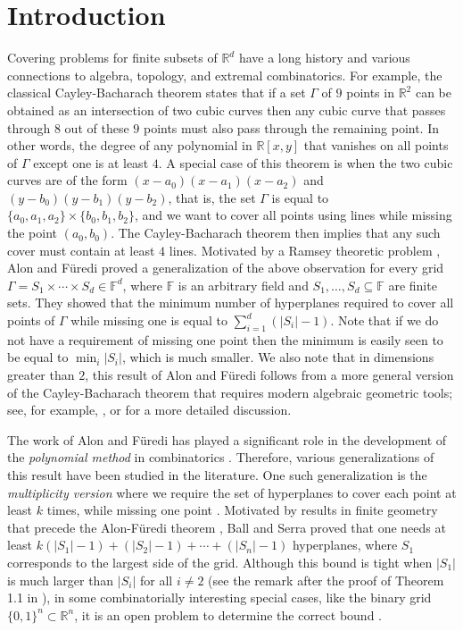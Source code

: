\documentclass[usenames,dvipsnames, 11pt]{article}
\numberwithin{thm}{section}
\theoremstyle{definition}
\theoremstyle{definition}
\theoremstyle{definition}
\newcommand{\1}{\mathbf{1}}
\begin{document}
\section{Introduction}
Covering problems for finite subsets of $\mathbb{R}^d$ have a long history and various connections to algebra, topology, and extremal combinatorics. 
For example, the classical Cayley-Bacharach theorem \cite{eisenbud1996cayley} states that if a set $\Gamma$ of $9$ points in $\mathbb{R}^2$ can be obtained as an intersection of two cubic curves then any cubic curve that passes through $8$ out of these $9$ points must also pass through the remaining point. 
In other words, the degree of any polynomial in $\mathbb{R}[x, y]$ that vanishes on all points of $\Gamma$ except one is at least $4$. 
A special case of this theorem is when the two cubic curves are of the form $(x-a_0)(x - a_1)(x - a_2)$ and $(y - b_0)(y - b_1)(y - b_2)$, that is, the set $\Gamma$ is equal to $\{a_0, a_1, a_2\} \times \{b_0, b_1, b_2\}$, and we want to cover all points using lines while missing the point $(a_0, b_0)$. 
The Cayley-Bacharach theorem then implies that any such cover must contain at least $4$ lines.  
Motivated by a Ramsey theoretic problem \cite{K94}, Alon and F\"uredi \cite{AF93} proved a generalization of the above observation for every grid $\Gamma = S_1 \times \cdots \times S_d \in \mathbb{F}^d$, where $\mathbb{F}$ is an arbitrary field and $S_1, \dots, S_d \subseteq \mathbb{F}$ are finite sets.
They showed that the minimum number of hyperplanes required to cover all points of $\Gamma$ while missing one is equal to $\sum_{i = 1}^d (|S_i| - 1)$. 
Note that if we do not have a requirement of missing one point then the minimum is easily seen to be equal to $\min_{i} |S_i|$, which is much smaller. 
We also note that in dimensions greater than $2$, this result of Alon and F\"uredi follows from a more general version of the Cayley-Bacharach theorem that requires modern algebraic geometric tools; see, for example, \cite[Thm. CB7]{eisenbud1996cayley}, \cite[Thm. 5.1]{karasev2019residues} or \cite[Sec.~2.3]{Verlinde24} for a more detailed discussion. 


The work of Alon and F\"uredi has played a significant role in the development of the \textit{polynomial method} in combinatorics \cite{Alon99, BGGSZ22}.
Therefore, various generalizations of this result have been studied in the literature. 
One such generalization is the \textit{multiplicity version} where we require the set of hyperplanes to cover each point at least $k$ times, while missing one point \cite{BS09}. 
Motivated by results in finite geometry that precede the Alon-F\"uredi theorem \cite{J77, BS78, B92}, Ball and Serra proved that one needs at least $k(|S_1| - 1) + (|S_2| - 1) + \cdots + (|S_n| - 1)$ hyperplanes, where $S_1$ corresponds to the largest side of the grid. 
Although this bound is tight when $|S_1|$ is much larger than $|S_i|$ for all $i \neq 2$ (see the remark after the proof of Theorem 1.1 in \cite{BBDD23}), in some combinatorially interesting special cases, like the binary grid $\{0, 1\}^n \subset \mathbb{R}^n$, it is an open problem to determine the correct bound \cite{CH20, SW20}. 
\end{document}
